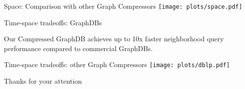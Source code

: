 \documentclass[11pt]{beamer}
\begin{document}
\begin{frame}{Space: Comparison with other Graph Compressors}
\centering
    \texttt{[image: plots/space.pdf]}
\end{frame}

\begin{frame}{Time-space tradeoffs: GraphDBs}

\begin{tcolorbox}[
    colback=accent!15,      %
    colframe=accent,        %
    width=\textwidth,       %
    boxrule=0.5pt,          %
    arc=2mm                 %
  ]
    Our Compressed GraphDB achieves up to 10x faster neighborhood query performance compared to commercial GraphDBs.
  \end{tcolorbox}

\end{frame}

\begin{frame}{Time-space tradeoffs: other Graph Compressors}
  \centering
    \texttt{[image: plots/dblp.pdf]}
  
  
\end{frame}


\begin{frame}
\huge Thanks for your attention    
\end{frame}
\end{document}
